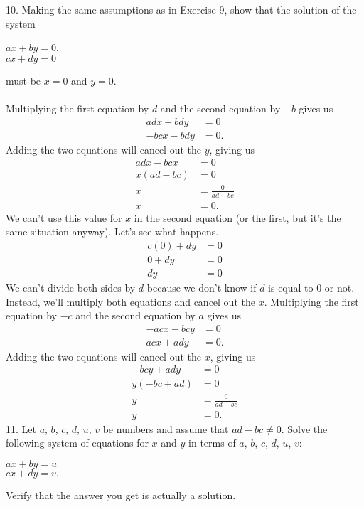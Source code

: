 \documentclass[12pt]{article}
\begin{document}
10. Making the same assumptions as in Exercise 9, show that the solution of the system
\begin{center}
$ax+by=0$, \\
$cx+dy=0$
\end{center}
must be $x=0$ and $y=0$. \\
\\
Multiplying the first equation by $d$ and the second equation by $-b$ gives us
\begin{align*}
adx+bdy&=0 \\
-bcx-bdy&=0.
\end{align*}
Adding the two equations will cancel out the $y$, giving us
\begin{align*}
adx-bcx&=0 \\
x(ad-bc)&=0 \\
x&=\displaystyle \frac{0}{ad-bc} \\
x&=0.
\end{align*}
We can't use this value for $x$ in the second equation (or the first, but it's the same situation anyway). Let's see what happens. 
\begin{align*}
c(0)+dy&=0 \\
0+dy&=0 \\
dy&=0
\end{align*}
We can't divide both sides by $d$ because we don't know if $d$ is equal to 0 or not. \\
Instead, we'll multiply both equations and cancel out the $x$. Multiplying the first equation by $-c$ and the second equation by $a$ gives us
\begin{align*}
-acx-bcy&=0 \\
acx+ady&=0.
\end{align*}
Adding the two equations will cancel out the $x$, giving us
\begin{align*}
-bcy+ady&=0 \\
y(-bc+ad)&=0 \\
y&=\displaystyle \frac{0}{ad-bc} \\
y&=0.
\end{align*}
11. Let $a$, $b$, $c$, $d$, $u$, $v$ be numbers and assume that $ad-bc\neq0$. Solve the following system of equations for $x$ and $y$ in terms of $a$, $b$, $c$, $d$, $u$, $v$:
\begin{center}
$ax+by=u$ \\
$cx+dy=v.$
\end{center}
Verify that the answer you get is actually a solution. \\
\\
\end{document}
